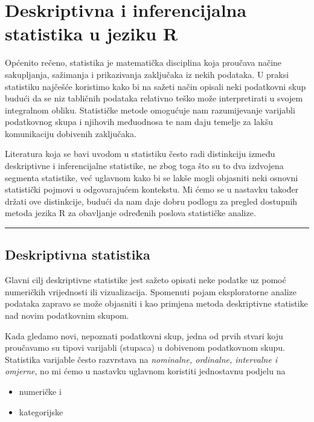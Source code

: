 \documentclass[]{book}
\providecommand{\tightlist}{%
  \setlength{\itemsep}{0pt}\setlength{\parskip}{0pt}}
\theoremstyle{definition}
\theoremstyle{definition}
\theoremstyle{definition}
\theoremstyle{remark}
\begin{document}
\chapter{Deskriptivna i inferencijalna statistika u jeziku
R}\label{deskriptivna}

Općenito rečeno, statistika je matematička disciplina koja proučava
načine sakupljanja, sažimanja i prikazivanja zaključaka iz nekih
podataka. U praksi statistiku najčešće koristimo kako bi na sažeti način
opisali neki podatkovni skup budući da se niz tabličnih podataka
relativno teško može interpretirati u svojem integralnom obliku.
Statističke metode omogućuje nam razumijevanje varijabli podatkovnog
skupa i njihovih međuodnosa te nam daju temelje za lakšu komunikaciju
dobivenih zaključaka.

Literatura koja se bavi uvodom u statistiku često radi distinkciju
između deskriptivne i inferencijalne statistike, ne zbog toga što su to
dva izdvojena segmenta statistike, već uglavnom kako bi se lakše mogli
objasniti neki osnovni statistički pojmovi u odgovarajućem kontekstu. Mi
ćemo se u nastavku također držati ove distinkcije, budući da nam daje
dobru podlogu za pregled dostupnih metoda jezika R za obavljanje
određenih poslova statističke analize.

\begin{center}\rule{0.5\linewidth}{\linethickness}\end{center}

\section{Deskriptivna statistika}\label{deskriptivna-statistika}

Glavni cilj deskriptivne statistike jest sažeto opisati neke podatke uz
pomoć numeričkih vrijednosti ili vizualizacija. Spomenuti pojam
eksploratorne analize podataka zapravo se može objasniti i kao primjena
metoda deskriptivne statistike nad novim podatkovnim skupom.

Kada gledamo novi, nepoznati podatkovni skup, jedna od prvih stvari koju
proučavamo su tipovi varijabli (stupaca) u dobivenom podatkovnom skupu.
Statistika varijable često razvrstava na \emph{nominalne, ordinalne,
intervalne i omjerne}, no mi ćemo u nastavku uglavnom koristiti
jednostavnu podjelu na

\begin{itemize}
\tightlist
\item
  numeričke i
\item
  kategorijske
\end{itemize}
\end{document}
